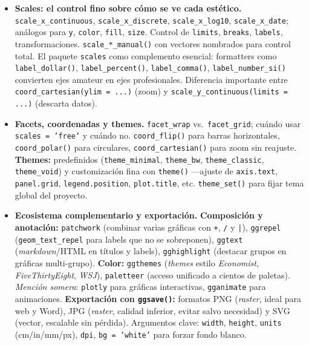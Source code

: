 \documentclass[11pt,letterpaper]{article}
\newcommand{\blue}[1]{{\color{cerulean}#1}}
\begin{document}
\begin{itemize}[leftmargin=*, itemsep=2pt]
    \item \textbf{Scales: el control fino sobre cómo se ve cada estético.} \texttt{scale\_x\_continuous}, \texttt{scale\_x\_discrete}, \texttt{scale\_x\_log10}, \texttt{scale\_x\_date}; análogos para \texttt{y}, \texttt{color}, \texttt{fill}, \texttt{size}. Control de \texttt{limits}, \texttt{breaks}, \texttt{labels}, transformaciones. \texttt{scale\_*\_manual()} con vectores nombrados para control total. \blue{El paquete \texttt{scales}} como complemento esencial: formatters como \texttt{label\_dollar()}, \texttt{label\_percent()}, \texttt{label\_comma()}, \texttt{label\_number\_si()} convierten ejes amateur en ejes profesionales. Diferencia importante entre \texttt{coord\_cartesian(ylim = ...)} (zoom) y \texttt{scale\_y\_continuous(limits = ...)} (descarta datos).
    \item \textbf{Facets, coordenadas y themes.} \texttt{facet\_wrap} vs.\ \texttt{facet\_grid}; cuándo usar \texttt{scales = 'free'} y cuándo no. \texttt{coord\_flip()} para barras horizontales, \texttt{coord\_polar()} para circulares, \texttt{coord\_cartesian()} para zoom sin reajuste. \textbf{Themes:} predefinidos (\texttt{theme\_minimal}, \texttt{theme\_bw}, \texttt{theme\_classic}, \texttt{theme\_void}) y customización fina con \texttt{theme()} ---ajuste de \texttt{axis.text}, \texttt{panel.grid}, \texttt{legend.position}, \texttt{plot.title}, etc. \texttt{theme\_set()} para fijar tema global del proyecto.
    \item \textbf{Ecosistema complementario y exportación.} \textbf{Composición y anotación:} \texttt{patchwork} (combinar varias gráficas con \texttt{+}, \texttt{/} y \texttt{|}), \texttt{ggrepel} (\texttt{geom\_text\_repel} para labels que no se sobreponen), \texttt{ggtext} (\textit{markdown}/HTML en títulos y labels), \texttt{gghighlight} (destacar grupos en gráficas multi-grupo). \textbf{Color:} \texttt{ggthemes} (\textit{themes} estilo \textit{Economist}, \textit{FiveThirtyEight}, \textit{WSJ}), \texttt{paletteer} (acceso unificado a cientos de paletas). \textit{Mención somera}: \texttt{plotly} para gráficas interactivas, \texttt{gganimate} para animaciones. \textbf{Exportación con \texttt{ggsave()}:} formatos PNG (\textit{raster}, ideal para web y Word), JPG (\textit{raster}, calidad inferior, evitar salvo necesidad) y SVG (vector, escalable sin pérdida). Argumentos clave: \texttt{width}, \texttt{height}, \texttt{units} (cm/in/mm/px), \texttt{dpi}, \texttt{bg = 'white'} para forzar fondo blanco.
\end{itemize}
\end{document}
